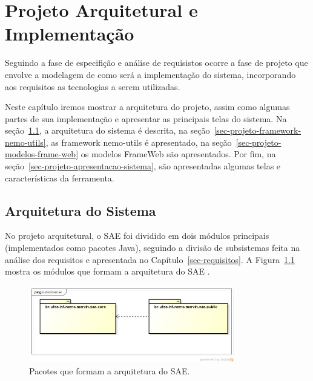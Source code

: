 
\chapter{Projeto Arquitetural e Implementação}
\label{sec-revisao}


Seguindo a fase de especifição e análise de requisistos ocorre a fase de projeto que envolve a modelagem de como será a implementação do sistema, incorporando aos requisitos as tecnologias a serem utilizadas. 

Neste capítulo iremos mostrar a arquitetura do projeto, assim como algumas partes de sua implementação e apresentar as principais telas do sistema. Na seção~\ref{sec-projeto-arquitetura-sistema}, a arquitetura do sistema é descrita, na seção~\ref{sec-projeto-framework-nemo-utils}, as framework nemo-utils é apresentado, na seção~\ref{sec-projeto-modelos-frame-web} os modelos FrameWeb são apresentados. Por fim, na seção~\ref{sec-projeto-apresentacao-sistema}, são apresentadas algumas telas e características da ferramenta. 







\section{Arquitetura do Sistema}
\label{sec-projeto-arquitetura-sistema}

No projeto arquitetural, o SAE foi dividido em dois módulos principais (implementados como pacotes Java), seguindo a divisão de subsistemas feita na análise dos requisitos e apresentada no Capítulo~\ref{sec-requisitos}. A Figura~\ref{fig-projeto-diagrama-pacotes} mostra os módulos que formam a arquitetura do SAE	.

\begin{figure}[h]
	\centering
	\includegraphics[width=0.8\textwidth]{figuras/projeto/fig-projeto-diagrama-pacotes}
	\caption{Pacotes que formam a arquitetura do SAE.}
	\label{fig-projeto-diagrama-pacotes}
\end{figure}



